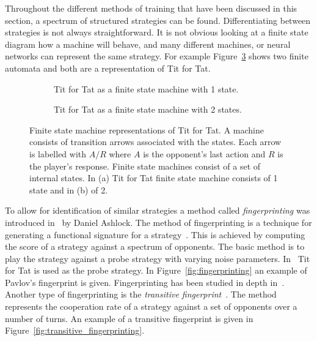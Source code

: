 Throughout the different methods of training that have been discussed in this
section, a spectrum of structured strategies can be found. Differentiating
between strategies is not always straightforward. It is not obvious looking at a
finite state diagram how a machine will behave, and many different machines, or
neural networks can represent the same strategy. For example
Figure~\ref{fig:machine_tft} shows two finite automata and both are a
representation of Tit for Tat.

\begin{figure}[!hbtp]
    \begin{subfigure}{.45\textwidth}\centering
        
        \caption{Tit for Tat as a finite state machine with 1 state.}\label{fig:representation_a}
    \end{subfigure}
    \begin{subfigure}{.45\textwidth}\centering
        
        \caption{Tit for Tat as a finite state machine with 2 states.}\label{fig:representation_b}
     \end{subfigure}
     \caption{Finite state machine representations of Tit for Tat. A machine
     consists of transition arrows associated with the states. Each arrow is
     labelled with \(A/R\) where \(A\) is the opponent's last action and \(R\)
     is the player's response. Finite state machines consist of a set of
     internal states. In (a) Tit for Tat finite state
     machine consists of 1 state and in (b) of 2.}\label{fig:machine_tft}
\end{figure}

To allow for identification of similar strategies a method called
\textit{fingerprinting} was introduced in~\cite{Ashlock2005} by Daniel Ashlock. The method of fingerprinting is a
technique for generating a functional signature for a
strategy~\cite{Ashlock2008}. This is achieved by computing the score of a
strategy against a spectrum of opponents. The basic method is to play the
strategy against a probe strategy with varying noise parameters.
In~\cite{Ashlock2005} Tit for Tat is used as the probe strategy. In
Figure~\ref{fig:fingerprinting} an example of Pavlov's fingerprint is given.
Fingerprinting has been studied in depth in~\cite{Ashlock2008, Ashlock2009,
Ashlock2010, Ashlock2006a}. Another type of fingerprinting is the
\textit{transitive fingerprint}~\cite{axelrodproject}.
The method represents the cooperation rate of a strategy against a set of opponents
over a number of turns. An example of a transitive fingerprint is given in
Figure~\ref{fig:transitive_fingerprinting}.

